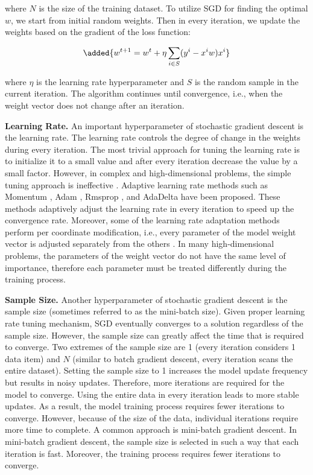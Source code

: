 where $N$ is the size of the training dataset.
To utilize SGD for finding the optimal $w$, we start from initial random weights.
Then in every iteration, we update the weights based on the gradient of the loss function:

\begin{equation}
\added{{w}^{t+1} = {w}^t + \eta \sum_{i \in S} (y^i - x^iw)x^i}
\end{equation}


where $\eta$ is the learning rate hyperparameter and $S$ is the random sample in the current iteration.
The algorithm continues until convergence, i.e., when the weight vector does not change after an iteration.

\textbf{Learning Rate.}
An important hyperparameter of stochastic gradient descent is the learning rate.
The learning rate controls the degree of change in the weights during every iteration.
The most trivial approach for tuning the learning rate is to initialize it to a small value and after every iteration decrease the value by a small factor.
However, in complex and high-dimensional problems, the simple tuning approach is ineffective \cite{schaul2013no}. 
Adaptive learning rate methods such as Momentum \cite{qian1999momentum}, Adam \cite{kingma2014adam}, Rmsprop \cite{tieleman2012lecture}, and AdaDelta \cite{zeiler2012adadelta} have been proposed.
These methods adaptively adjust the learning rate in every iteration to speed up the convergence rate.
Moreover, some of the learning rate adaptation methods perform per coordinate modification, i.e., every parameter of the model weight vector is adjusted separately from the others \cite{kingma2014adam, tieleman2012lecture, zeiler2012adadelta}. 
In many high-dimensional problems, the parameters of the weight vector do not have the same level of importance, therefore each parameter must be treated differently during the training process.

\textbf{Sample Size.}
Another hyperparameter of stochastic gradient descent is the sample size (sometimes referred to as the mini-batch size).
Given proper learning rate tuning mechanism, SGD eventually converges to a solution regardless of the sample size.
However, the sample size can greatly affect the time that is required to converge.
Two extremes of the sample size are 1 (every iteration considers 1 data item) and $N$ (similar to batch gradient descent, every iteration scans the entire dataset).
Setting the sample size to 1 increases the model update frequency but results in noisy updates.
Therefore, more iterations are required for the model to converge.
Using the entire data in every iteration leads to more stable updates.
As a result, the model training process requires fewer iterations to converge.
However, because of the size of the data, individual iterations require more time to complete.
A common approach is mini-batch gradient descent.
In mini-batch gradient descent, the sample size is selected in such a way that each iteration is fast.
Moreover, the training process requires fewer iterations to converge.

